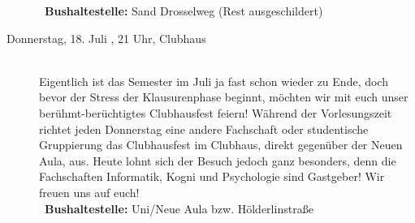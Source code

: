 \begin{description}
~\textbf{Bushaltestelle:} Sand Drosselweg (Rest ausgeschildert)


\item[Donnerstag, 18. Juli \YEAR, 21 Uhr, Clubhaus ]\ \\
Eigentlich ist das Semester im Juli ja fast schon wieder zu Ende, doch bevor der Stress der Klausurenphase beginnt, möchten wir mit euch unser berühmt-berüchtigtes Clubhausfest feiern!
Während der Vorlesungszeit richtet jeden Donnerstag eine andere Fachschaft oder studentische Gruppierung das Clubhausfest im Clubhaus, direkt gegenüber der Neuen Aula, aus. Heute lohnt sich der Besuch jedoch ganz besonders, denn die Fachschaften Informatik, Kogni und Psychologie sind Gastgeber! Wir freuen uns auf euch!\\

~\textbf{Bushaltestelle:} Uni/Neue Aula bzw. Hölderlinstraße

\end{description}
